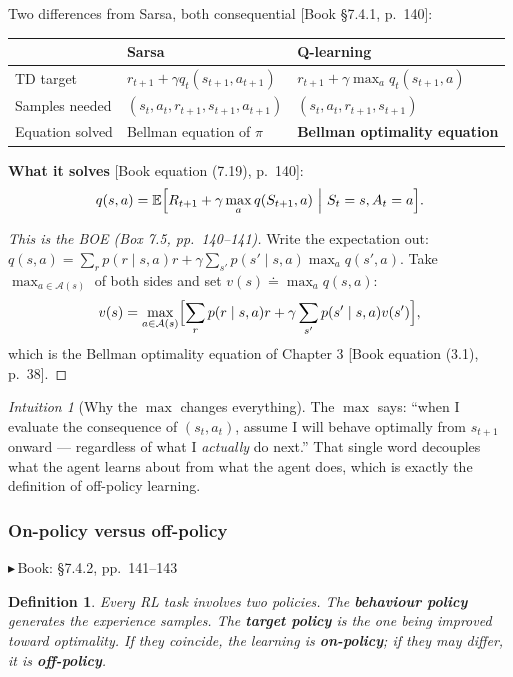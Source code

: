 \documentclass[11pt, letterpaper]{article}
\theoremstyle{runin}
\newtheorem*{definition}{Definition}
\theoremstyle{runinplain}
\theoremstyle{remark}
\newtheorem*{intuition}{Intuition}
\newcommand{\E}{\mathbb{E}}
\newcommand{\Aspace}{\mathcal{A}}
\newcommand{\bk}[1]{{\color{bookblue}\small$\blacktriangleright$\,\textsf{Book: #1}}}
\newcommand{\bkin}[1]{{\color{bookblue}\small[\textsf{Book #1}]}}
\begin{document}
Two differences from Sarsa, both consequential \bkin{\S7.4.1, p.~140}:

\begin{center}
\small
\begin{tabular}{@{}lll@{}}
\toprule
 & Sarsa & Q-learning \\
\midrule
TD target & $r_{t+1}+\gamma q_t(s_{t+1},a_{t+1})$ & $r_{t+1}+\gamma\max_a q_t(s_{t+1},a)$ \\
Samples needed & $(s_t,a_t,r_{t+1},s_{t+1},a_{t+1})$ & $(s_t,a_t,r_{t+1},s_{t+1})$ \\
Equation solved & Bellman equation of $\pi$ & \textbf{Bellman optimality equation} \\
\bottomrule
\end{tabular}
\end{center}

\textbf{What it solves} \bkin{equation (7.19), p.~140}:
\[
  q(s,a)=\E\Bigl[R_{t+1}+\gamma\max_a q(S_{t+1},a)\ \Big|\ S_t=s,A_t=a\Bigr].
\]

\begin{proof}[This is the BOE (Box 7.5, pp.~140--141)]
Write the expectation out:
$q(s,a)=\sum_r p(r\mid s,a)r+\gamma\sum_{s'}p(s'\mid s,a)\max_{a}q(s',a)$. Take
$\max_{a\in\Aspace(s)}$ of both sides and set $v(s)\doteq\max_a q(s,a)$:
\[
  v(s)=\max_{a\in\Aspace(s)}\Bigl[\sum_r p(r\mid s,a)r+\gamma\sum_{s'}p(s'\mid s,a)v(s')\Bigr],
\]
which is the Bellman optimality equation of Chapter 3 \bkin{equation (3.1), p.~38}.
\end{proof}

\begin{intuition}[Why the $\max$ changes everything]
The $\max$ says: ``when I evaluate the consequence of $(s_t,a_t)$, assume I will
behave optimally from $s_{t+1}$ onward --- regardless of what I \emph{actually} do
next.'' That single word decouples what the agent learns about from what the agent
does, which is exactly the definition of off-policy learning.
\end{intuition}

\subsubsection{On-policy versus off-policy}

\bk{\S7.4.2, pp.~141--143}

\begin{definition}
Every RL task involves two policies. The \textbf{behaviour policy} generates the
experience samples. The \textbf{target policy} is the one being improved toward
optimality. If they coincide, the learning is \textbf{on-policy}; if they may
differ, it is \textbf{off-policy}.
\end{definition}
\end{document}
